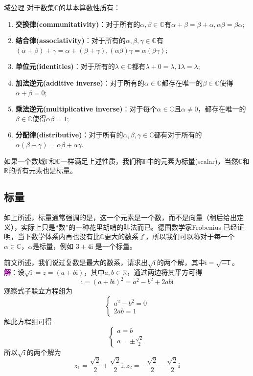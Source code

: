 \begin{axiom}{域公理}
	对于数集$\mathbb{C}$的基本算数性质有：
	\begin{enumerate}
		\item \textbf{交换律(communitativity)}：对于所有的$\alpha,\beta \in \mathbb{C}$有$\alpha+\beta=\beta+\alpha,\alpha\beta=\beta\alpha$;
		\item \textbf{结合律(associativity)}：对于所有的$\alpha,\beta,\gamma \in \mathbb{C}$有$(\alpha+\beta)+\gamma=\alpha+(\beta+\gamma),(\alpha\beta)\gamma=\alpha(\beta\gamma)$;
		\item \textbf{单位元(identities)}：对于所有的$\lambda \in \mathbb{C}$都有$\lambda+0=\lambda,1\lambda=\lambda$;
		\item \textbf{加法逆元(additive inverse)}：对于所有的$\alpha \in \mathbb{C}$都存在唯一的$\beta \in \mathbb{C}$使得$\alpha+\beta=0$;
		\item \textbf{乘法逆元(multiplicative inverse)}：对于每个$\alpha \in\mathbb{C}$且$\alpha\neq 0$，都存在唯一的$\beta \in \mathbb{C}$使得$\alpha\beta=1$;
		\item \textbf{分配律(distributive)}：对于所有的$\alpha,\beta,\gamma \in \mathbb{C}$都有对于所有的$\alpha(\beta+\gamma)=\alpha\beta +\alpha\gamma$.
	\end{enumerate}
\end{axiom}

如果一个数域$\mathbb{F}$和$\mathbb{C}$一样满足上述性质，我们称$\mathbb{F}$中的元素为标量(scalar)，当然$\mathbb{C}$和$\mathbb{R}$的所有元素也是标量。

\subsection{标量}

如上所述，标量通常强调的是，这一个元素是一个数，而不是向量（稍后给出定义），实际上只是``数''的一种花里胡哨的叫法而已。德国数学家Frobenius 已经证明，当下数学体系内再也没有比$\mathbb{C}$更大的数系了，所以我们可以称对于每一个$\alpha \in \mathbb{C}$，$\alpha$是标量，例如 $3+4\mathrm{i}$ 是一个标量。

\begin{example}
	前文所述，我们说过复数是最大的数系，请求出$\sqrt{\mathrm{i}}$的两个解，其中$\mathrm{i}=\sqrt{-1}$。
	\tcblower
	\textcolor{purple}{\textbf{解}}：设$\sqrt{\mathrm{i}}=z=(a+b\mathrm{i})$，其中$a,b \in \mathbb{R}$，通过两边将其平方可得$$\mathrm{i}=(a+b\mathrm{i})^2=a^2-b^2+2ab\mathrm{i}$$观察式子联立方程组为$$\left\{\begin{matrix} 
		a^2-b^2=0 \\  
		2ab=1
	\end{matrix}\right. $$
	解此方程组可得$$\left\{\begin{matrix} 
		a=b \\ 
		a=\pm \frac{\sqrt{2} }{2} 
	\end{matrix}\right. $$
	所以$\sqrt{\mathrm{i}}$的两个解为$$z_1=\frac{\sqrt{2}}{2}+\frac{\sqrt{2}}{2}\mathrm{i},z_2=-\frac{\sqrt{2}}{2}-\frac{\sqrt{2}}{2}\mathrm{i}$$
\end{example}


